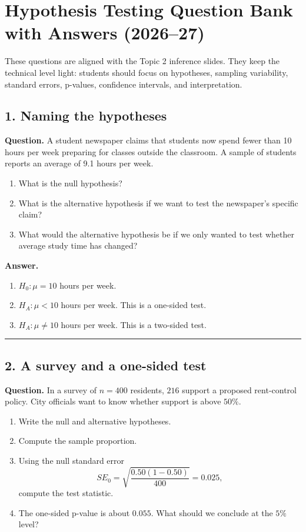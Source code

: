 \documentclass[12pt]{article}
\begin{document}
\section*{Hypothesis Testing Question Bank with Answers (2026--27)}

\noindent
These questions are aligned with the Topic 2 inference slides. They keep the technical level light: students should focus on hypotheses, sampling variability, standard errors, p-values, confidence intervals, and interpretation.

\subsection*{1. Naming the hypotheses}

\noindent
\textbf{Question.}
A student newspaper claims that students now spend fewer than 10 hours per week preparing for classes outside the classroom. A sample of students reports an average of 9.1 hours per week.

\begin{enumerate}[label=(\alph*)]
\item What is the null hypothesis?
\item What is the alternative hypothesis if we want to test the newspaper's specific claim?
\item What would the alternative hypothesis be if we only wanted to test whether average study time has changed?
\end{enumerate}

\noindent
\textbf{Answer.}
\begin{enumerate}[label=(\alph*)]
\item $H_0: \mu = 10$ hours per week.
\item $H_A: \mu < 10$ hours per week. This is a one-sided test.
\item $H_A: \mu \ne 10$ hours per week. This is a two-sided test.
\end{enumerate}

\hrule

\subsection*{2. A survey and a one-sided test}

\noindent
\textbf{Question.}
In a survey of $n=400$ residents, $216$ support a proposed rent-control policy. City officials want to know whether support is above $50\%$.

\begin{enumerate}[label=(\alph*)]
\item Write the null and alternative hypotheses.
\item Compute the sample proportion.
\item Using the null standard error
\[
SE_0 = \sqrt{\frac{0.50(1-0.50)}{400}} = 0.025,
\]
compute the test statistic.
\item The one-sided p-value is about $0.055$. What should we conclude at the $5\%$ level?
\end{enumerate}
\end{document}
